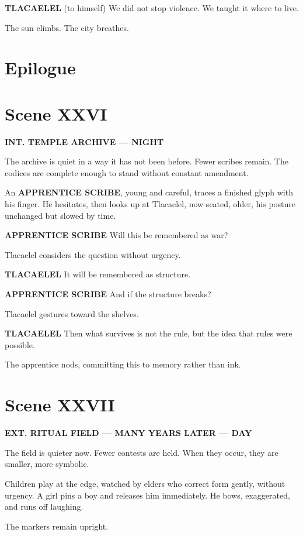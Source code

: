 \documentclass[12pt]{article}
\begin{document}
\textbf{TLACAELEL}  
(to himself)  
We did not stop violence.  
We taught it where to live.

The sun climbs. The city breathes.

\section*{Epilogue}

\section*{Scene XXVI}

\textbf{INT. TEMPLE ARCHIVE --- NIGHT}

The archive is quiet in a way it has not been before. Fewer scribes remain. The codices are complete enough to stand without constant amendment.

An \textbf{APPRENTICE SCRIBE}, young and careful, traces a finished glyph with his finger. He hesitates, then looks up at Tlacaelel, now seated, older, his posture unchanged but slowed by time.

\textbf{APPRENTICE SCRIBE}  
Will this be remembered as war?

Tlacaelel considers the question without urgency.

\textbf{TLACAELEL}  
It will be remembered as structure.

\textbf{APPRENTICE SCRIBE}  
And if the structure breaks?

Tlacaelel gestures toward the shelves.

\textbf{TLACAELEL}  
Then what survives is not the rule, but the idea that rules were possible.

The apprentice nods, committing this to memory rather than ink.

\section*{Scene XXVII}

\textbf{EXT. RITUAL FIELD --- MANY YEARS LATER --- DAY}

The field is quieter now. Fewer contests are held. When they occur, they are smaller, more symbolic.

Children play at the edge, watched by elders who correct form gently, without urgency. A girl pins a boy and releases him immediately. He bows, exaggerated, and runs off laughing.

The markers remain upright.
\end{document}
